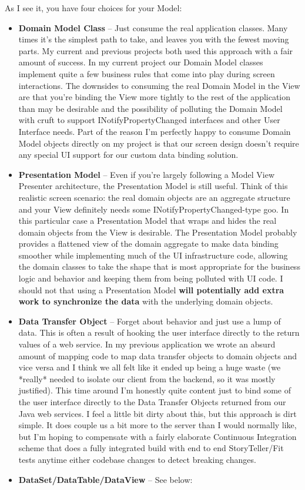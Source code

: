 \documentclass{article}
\begin{document}
{As I see it, you have four choices for your Model:
 \begin{itemize}
    \item \textbf{Domain Model Class} – Just consume the real application classes.  Many times it's the simplest path to take, and leaves you with the fewest moving parts.  My current and previous projects both used this approach with a fair amount of success.  In my current project our Domain Model classes implement quite a few business rules that come into play during screen interactions.  The downsides to consuming the real Domain Model in the View are that you're binding the View more tightly to the rest of the application than may be desirable and the possibility of polluting the Domain Model with cruft to support INotifyPropertyChanged interfaces and other User Interface needs.  Part of the reason I'm perfectly happy to consume Domain Model objects directly on my project is that our screen design doesn't require any special UI support for our custom data binding solution.
    \item \textbf{Presentation Model} – Even if you're largely following a Model View Presenter architecture, the Presentation Model is still useful.  Think of this realistic screen scenario:  the real domain objects are an aggregate structure and your View definitely needs some INotifyPropertyChanged-type goo.  In this particular case a Presentation Model that wraps and hides the real domain objects from the View is desirable.  The Presentation Model probably provides a flattened view of the domain aggregate to make data binding smoother while implementing much of the UI infrastructure code, allowing the domain classes to take the shape that is most appropriate for the business logic and behavior and keeping them from being polluted with UI code.  I should not that using a Presentation Model \textbf{will potentially add extra work to synchronize the data} with the underlying domain objects.
    \item \textbf{Data Transfer Object} – Forget about behavior and just use a lump of data.  This is often a result of hooking the user interface directly to the return values of a web service.  In my previous application we wrote an absurd amount of mapping code to map data transfer objects to domain objects and vice versa and I think we all felt like it ended up being a huge waste (we *really* needed to isolate our client from the backend, so it was mostly justified).  This time around I'm honestly quite content just to bind some of the user interface directly to the Data Transfer Objects returned from our Java web services.  I feel a little bit dirty about this, but this approach is dirt simple.  It does couple us a bit more to the server than I would normally like, but I'm hoping to compensate with a fairly elaborate Continuous Integration scheme that does a fully integrated build with end to end StoryTeller/Fit tests anytime either codebase changes to detect breaking changes.
    \item \textbf{DataSet/DataTable/DataView} – See below:
 \end{itemize}	

}
\end{document}
